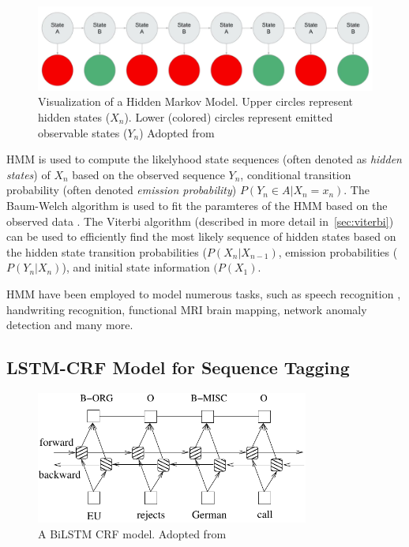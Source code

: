 \begin{figure}
	\includegraphics[scale=0.3]{hmm_example.png}
\caption{Visualization of a Hidden Markov Model. Upper circles represent hidden 
	states ($X_n$). Lower (colored) circles represent emitted observable states ($Y_n$)
	Adopted from \citep{hmm_figure}
	}
\label{fig:hmm}
\end{figure}

HMM is used to compute the likelyhood state sequences (often denoted
as \textit{hidden states}) of $X_n$ based on the 
observed sequence $Y_n$, conditional transition probability (often denoted
\textit{emission probability}) $P(Y_n \in A | X_n = x_n)$.
The Baum-Welch algorithm is used to fit the paramteres of the HMM based on the
observed data \citep{baggenstoss2001modified}. The Viterbi algorithm (described
in more detail in~\ref{sec:viterbi}) can be used to efficiently 
find the most likely sequence of hidden states based on 
the hidden state transition probabilities ($P(X_n | X_{n - 1})$,
emission probabilities ($P(Y_n | X_n)$), and initial state information $(P(X_1)$. 

HMM have been employed to model numerous tasks, such as 
speech recognition \citep{schuller2003hidden},
handwriting recognition, functional MRI brain mapping,  network anomaly
detection \citep{yu2010hidden} and many more.

\subsection{LSTM-CRF Model for Sequence Tagging}

\begin{figure}
	\includegraphics[width=0.8\textwidth]{biLstmCRF.pdf}
	\caption{A BiLSTM CRF model. Adopted from 
	\citep{huang2015bidirectional}
	}
	\label{fig:bilstm_crf}
\end{figure}


